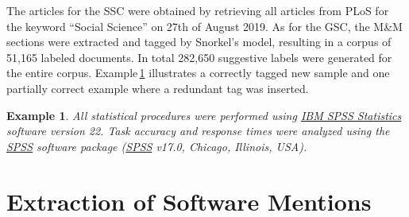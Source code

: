 \documentclass[runningheads]{llncs}
\newtheorem{ex}{Example}
\newcommand{\exref}[1]{Example\,\ref{#1}}
\begin{document}
The articles for the SSC were obtained by retrieving all articles from PLoS for the keyword ``Social Science'' on 27th of August 2019.
As for the GSC, the M\&M sections were extracted and tagged by Snorkel's model, resulting in a corpus of 51,165 labeled documents.
In total 282,650 suggestive labels were generated for the entire corpus.
\exref{ex4} illustrates a correctly tagged new sample and one partially correct example where a redundant tag was inserted. 
\begin{ex}\label{ex4}
All statistical procedures were performed using \ul{IBM SPSS Statistics} software version 22. 
Task accuracy and response times were analyzed using the \ul{SPSS} software package (\ul{SPSS} v17.0, Chicago, Illinois, USA).
\end{ex}


\section{Extraction of Software Mentions}
\end{document}
